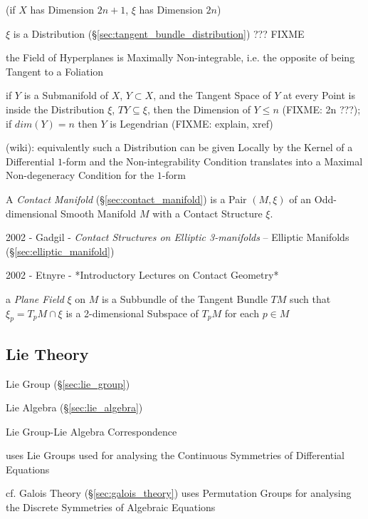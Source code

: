 (if $X$ has Dimension $2n+1$, $\xi$ has Dimension $2n$) %

$\xi$ is a Distribution (\S\ref{sec:tangent_bundle_distribution}) ??? FIXME

the Field of Hyperplanes is Maximally Non-integrable, i.e. the opposite of
being Tangent to a Foliation

if $Y$ is a Submanifold of $X$, $Y \subset X$, and the Tangent Space of $Y$ at
every Point is inside the Distribution $\xi$, $T Y \subseteq \xi$, then the
Dimension of $Y \leq n$ (FIXME: 2n ???); if $dim(Y) = n$ then $Y$ is Legendrian
(FIXME: explain, xref)

(wiki): equivalently such a Distribution can be given Locally by the Kernel of
a Differential $1$-form and the Non-integrability Condition translates into a
Maximal Non-degeneracy Condition for the $1$-form

A \emph{Contact Manifold} (\S\ref{sec:contact_manifold}) is a Pair $(M,\xi)$ of
an Odd-dimensional Smooth Manifold $M$ with a Contact Structure $\xi$.

2002 - Gadgil - \emph{Contact Structures on Elliptic 3-manifolds}
-- Elliptic Manifolds (\S\ref{sec:elliptic_manifold})

2002 - Etnyre - *Introductory Lectures on Contact Geometry*

a \emph{Plane Field} $\xi$ on $M$ is a Subbundle of the Tangent Bundle $TM$
such that $\xi_p = T_p M \cap \xi$ is a 2-dimensional Subspace of $T_pM$ for
each $p \in M$



\subsection{Lie Theory}\label{sec:lie_theory}

Lie Group (\S\ref{sec:lie_group})

Lie Algebra (\S\ref{sec:lie_algebra})

Lie Group-Lie Algebra Correspondence

uses Lie Groups used for analysing the Continuous Symmetries of
Differential Equations %

cf. Galois Theory (\S\ref{sec:galois_theory}) uses Permutation Groups
for analysing the Discrete Symmetries of Algebraic Equations %



